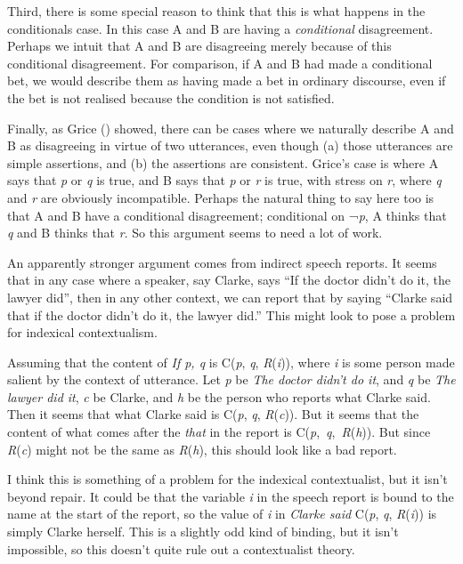 \documentclass[
  10pt,
  letterpaper,
  DIV=11,
  numbers=noendperiod,
  twoside]{scrartcl}
\begin{document}
Third, there is some special reason to think that this is what happens
in the conditionals case. In this case A and B are having a
\emph{conditional} disagreement. Perhaps we intuit that A and B are
disagreeing merely because of this conditional disagreement. For
comparison, if A and B had made a conditional bet, we would describe
them as having made a bet in ordinary discourse, even if the bet is not
realised because the condition is not satisfied.

Finally, as Grice () showed, there can be
cases where we naturally describe A and B as disagreeing in virtue of
two utterances, even though (a) those utterances are simple assertions,
and (b) the assertions are consistent. Grice's case is where A says that
\emph{p} or \emph{q} is true, and B says that \emph{p} or \emph{r} is
true, with stress on \emph{r}, where \emph{q} and \emph{r} are obviously
incompatible. Perhaps the natural thing to say here too is that A and B
have a conditional disagreement; conditional on ¬\emph{p}, A thinks that
\emph{q} and B thinks that \emph{r}. So this argument seems to need a
lot of work.

An apparently stronger argument comes from indirect speech reports. It
seems that in any case where a speaker, say Clarke, says ``If the doctor
didn't do it, the lawyer did'', then in any other context, we can report
that by saying ``Clarke said that if the doctor didn't do it, the lawyer
did.'' This might look to pose a problem for indexical contextualism.

Assuming that the content of \emph{If p, q} is C(\emph{p}, \emph{q},
\emph{R}(\emph{i})), where \emph{i} is some person made salient by the
context of utterance. Let \emph{p} be \emph{The doctor didn't do it},
and \emph{q} be \emph{The lawyer did it}, \emph{c} be Clarke, and
\emph{h} be the person who reports what Clarke said. Then it seems that
what Clarke said is C(\emph{p}, \emph{q}, \emph{R}(\emph{c})). But it
seems that the content of what comes after the \emph{that} in the report
is C(\emph{p},~\emph{q},~\emph{R}(\emph{h})). But since
\emph{R}(\emph{c}) might not be the same as \emph{R}(\emph{h}), this
should look like a bad report.

I think this is something of a problem for the indexical contextualist,
but it isn't beyond repair. It could be that the variable \emph{i} in
the speech report is bound to the name at the start of the report, so
the value of \emph{i} in \emph{Clarke said} C(\emph{p}, \emph{q},
\emph{R}(\emph{i})) is simply Clarke herself. This is a slightly odd
kind of binding, but it isn't impossible, so this doesn't quite rule out
a contextualist theory.
\end{document}
